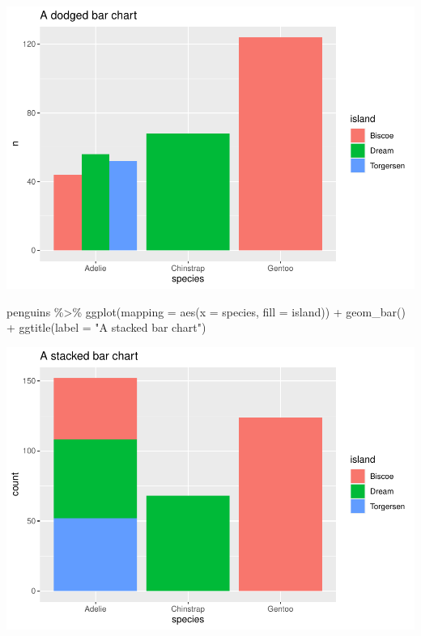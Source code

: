 \documentclass[
]{article}
\newenvironment{Shaded}{\begin{snugshade}}{\end{snugshade}}
\newcommand{\AttributeTok}[1]{\textcolor[rgb]{0.77,0.63,0.00}{#1}}
\newcommand{\FunctionTok}[1]{\textcolor[rgb]{0.00,0.00,0.00}{#1}}
\newcommand{\NormalTok}[1]{#1}
\newcommand{\SpecialCharTok}[1]{\textcolor[rgb]{0.00,0.00,0.00}{#1}}
\newcommand{\StringTok}[1]{\textcolor[rgb]{0.31,0.60,0.02}{#1}}
\begin{document}
\includegraphics{Grammar-of-Graphics_files/figure-latex/geom_bar_position_stack_and_dodge-2.pdf}

\begin{Shaded}
\begin{Highlighting}[]
\NormalTok{penguins }\SpecialCharTok{\%\textgreater{}\%}
  \FunctionTok{ggplot}\NormalTok{(}\AttributeTok{mapping =} \FunctionTok{aes}\NormalTok{(}\AttributeTok{x =}\NormalTok{ species, }\AttributeTok{fill =}\NormalTok{ island)) }\SpecialCharTok{+}
  \FunctionTok{geom\_bar}\NormalTok{() }\SpecialCharTok{+}
  \FunctionTok{ggtitle}\NormalTok{(}\AttributeTok{label =} \StringTok{"A stacked bar chart"}\NormalTok{)}
\end{Highlighting}
\end{Shaded}

\includegraphics{Grammar-of-Graphics_files/figure-latex/unnamed-chunk-1-1.pdf}
\end{document}
